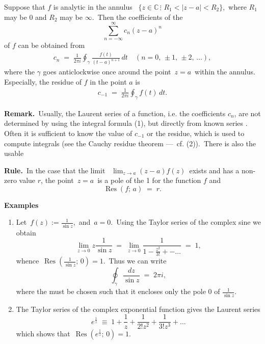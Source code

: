 \documentclass[12pt]{article}
\theoremstyle{definition}
\begin{document}
Suppose that $f$ is analytic in the annulus \,
$\{z\in\mathbb{C}\,\vdots\,\, R_1 < |z-a| < R_2 \}$,\, where $R_1$ may be 0 and $R_2$ may be $\infty$.\, Then the coefficients of the  
           $$\sum_{n = -\infty}^\infty c_n (z-a)^n$$
of $f$ can be obtained from
\begin{align}
   c_n \;=\; \frac{1}{2\pi i}\oint_{\gamma} \frac{f(t)}{(t-a)^{n+1}}\,dt
           \quad (n = 0,\,\pm 1,\,\pm 2,\,\ldots),
\end{align}
where the  $\gamma$ goes anticlockwise once around the point \,$z = a$\, within the annulus.\, Especially, the residue of $f$ in the point $a$ is
\begin{align}
       c_{-1} \;=\; \frac{1}{2\pi i}\oint_{\gamma} f(t)\,dt.
\end{align}

\textbf{Remark.}\, Usually, the Laurent series of a function, i.e. the coefficients $c_n$, are not determined by using the integral formula (1), but directly from known series .\, Often it is sufficient to know the value of $c_{-1}$ or the residue, which is used to compute integrals (see the Cauchy residue theorem ---\, cf. (2)).\, There is also the usable 

\textbf{Rule.}\, In the case that the limit \,
$\displaystyle\lim_{z\to a}(z-a)f(z)$\, exists and has a non-zero value $r$, the point\, $z = a$\, is a pole of the  1 for the function $f$ and 
$$\operatorname{Res}(f;\,a) \;=\; r.$$

\textbf{Examples}
\begin{enumerate}
\item Let\, $f(z) := \frac{1}{\sin{z}}$,\, and\, $a = 0$.\, Using the Taylor series of the complex sine we obtain
    $$\lim_{z\to 0}z\frac{1}{\sin{z}} \;=\; 
      \lim_{z\to 0}\frac{1}{1-\frac{z^2}{3!}+-\ldots} \;=\; 1,$$
whence\, $\operatorname{Res}(\frac{1}{\sin{z}};\,0) = 1$.\, Thus we can write
$$\oint_{\gamma}\frac{dz}{\sin{z}} \;=\; 2\pi i,$$
where the  must be chosen such that it encloses only the pole $0$ of 
$\frac{1}{\sin{z}}$.
\item The Taylor series of the complex exponential function gives the Laurent series
   $$e^{\frac{1}{z}} \;\equiv\; 1+\frac{1}{z}+\frac{1}{2!z^2}+\frac{1}{3!z^3}+\ldots$$
which shows that\, $\operatorname{Res}(e^{\frac{1}{z}};\,0) = 1.$
\end{enumerate}
\end{document}
